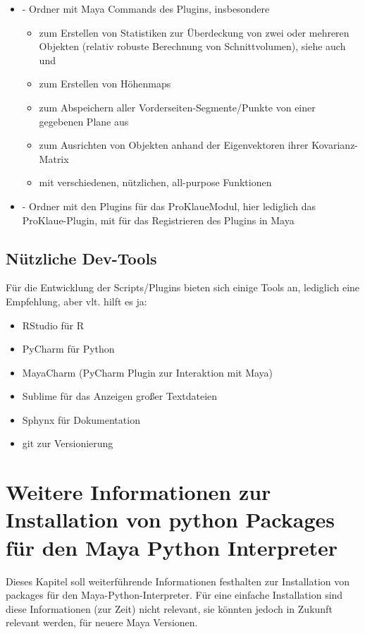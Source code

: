\documentclass[a4paper, openany, oneside]{memoir}
\begin{document}
\begin{itemize}
\begin{itemize}
\item {} - Ordner mit Maya Commands des Plugins, insbesondere
\begin{itemize}
\item {} zum Erstellen von Statistiken zur Überdeckung von zwei oder mehreren Objekten (relativ robuste Berechnung von Schnittvolumen), siehe auch  und 
\item {} zum Erstellen von Höhenmaps
\item {} zum Abspeichern aller Vorderseiten-Segmente/Punkte von einer gegebenen Plane aus 
\item {} zum Ausrichten von Objekten anhand der Eigenvektoren ihrer Kovarianz-Matrix
\item {} mit verschiedenen, nützlichen, all-purpose Funktionen
\end{itemize}
\item {} - Ordner mit den Plugins für das ProKlaueModul, hier lediglich das ProKlaue-Plugin, mit  für das Registrieren des Plugins in Maya 
\end{itemize}
\end{itemize}
\pagebreak

\section{Nützliche Dev-Tools}
Für die Entwicklung der Scripts/Plugins bieten sich einige Tools an, lediglich eine Empfehlung, aber vlt. hilft es ja:
\begin{itemize}
\item RStudio für R
\item PyCharm für Python
\item MayaCharm (PyCharm Plugin zur Interaktion mit Maya)
\item Sublime für das Anzeigen großer Textdateien
\item Sphynx für Dokumentation
\item git zur Versionierung
\end{itemize}


\chapter{Weitere Informationen zur Installation von python Packages für den Maya Python Interpreter}
Dieses Kapitel soll weiterführende Informationen festhalten zur Installation von packages für den Maya-Python-Interpreter. Für eine einfache Installation sind diese Informationen (zur Zeit) nicht relevant, sie könnten jedoch in Zukunft relevant werden, für neuere Maya Versionen.
\end{document}
